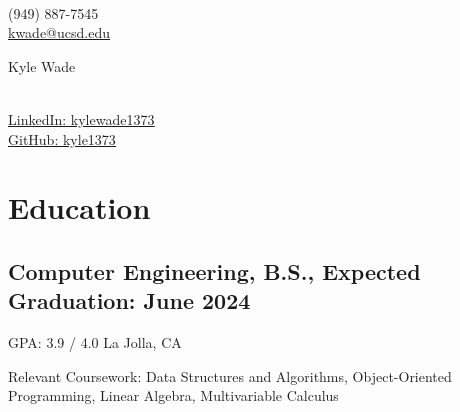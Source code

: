 \documentclass[a4,10pt]{article}
\newcommand{\subtext}[1]{
#1\par\vspace{-0.2cm}}
\begin{document}
\begin{center}
    \begin{minipage}[b]{0.24\textwidth}
            \large \\
            \normalsize (949) 887-7545 \\
            \normalsize
            \href{mailto:kwade@ucsd.edu}{\underline{\textcolor{linkblue}{kwade@ucsd.edu}}} 
    \end{minipage}%
    \begin{minipage}[b]{0.5\textwidth}
            \centering
            {\HUGE Kyle Wade} \\ %
            \vspace{0.1cm}
            {\color{UI_blue} \Large{}} \\
    \end{minipage}%
    \begin{minipage}[b]{0.24\textwidth}
            \flushright \normalsize  %
            {\href{https://www.linkedin.com/in/kylewade1373/}{\underline{\textcolor{linkblue}{LinkedIn: kylewade1373}}} } \\
            \vspace{.05cm}
            \href{https://github.com/kyle1373}{\underline{\textcolor{linkblue}{GitHub: kyle1373}}}
    \end{minipage} 
    \vspace{-0.45cm} 
\end{center}

\section{Education}
\subsection*{Computer Engineering, B.S., {\normalsize {}} \hfill Expected Graduation: June 2024}
\newline
{GPA: 3.9 / 4.0 \hfill La Jolla, CA}
\newline
\subtext{Relevant Coursework: Data Structures and Algorithms, Object-Oriented Programming, Linear Algebra, Multivariable Calculus}
\vspace{-.05cm}
\end{document}
